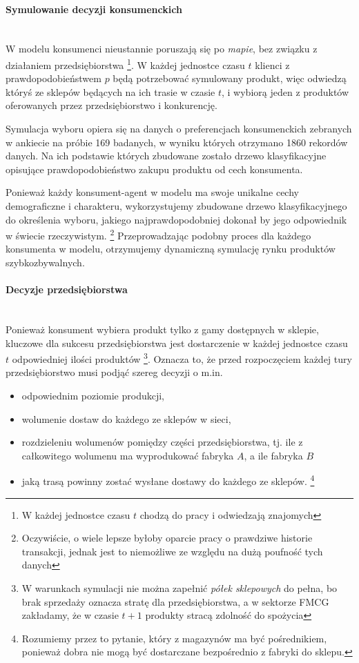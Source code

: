 \documentclass[polish, twoside, 12pt, a4paper]{article}
\theoremstyle{definition}
\theoremstyle{plain}
\theoremstyle{remark}
\begin{document}
\paragraph{Symulowanie decyzji konsumenckich}\mbox{}\\

W modelu konsumenci nieustannie poruszają się po \textit{mapie}, bez związku z działaniem przedsiębiorstwa \footnote{W każdej jednostce czasu $t$ chodzą do pracy i odwiedzają znajomych}. W każdej jednostce czasu $ t $ klienci z prawdopodobieństwem $ p $ będą potrzebować symulowany produkt, więc odwiedzą któryś ze sklepów będących na ich trasie w czasie $t$, i wybiorą jeden z produktów oferowanych przez przedsiębiorstwo i konkurencję. 

Symulacja wyboru opiera się na danych o preferencjach konsumenckich zebranych w ankiecie na próbie 169 badanych, w wyniku których otrzymano 1860 rekordów danych. Na ich podstawie których zbudowane zostało drzewo klasyfikacyjne opisujące prawdopodobieństwo zakupu produktu od cech konsumenta. 

Ponieważ każdy konsument-agent w modelu ma swoje unikalne cechy demograficzne i charakteru, wykorzystujemy zbudowane drzewo klasyfikacyjnego do określenia wyboru, jakiego najprawdopodobniej dokonał by jego odpowiednik w świecie rzeczywistym. \footnote{Oczywiście, o wiele lepsze byłoby oparcie pracy o prawdziwe historie transakcji, jednak jest to niemożliwe ze względu na dużą poufność tych danych} Przeprowadzając podobny proces dla każdego konsumenta w modelu, otrzymujemy dynamiczną symulację rynku produktów szybkozbywalnych. 

\paragraph{Decyzje przedsiębiorstwa}\mbox{}\\

Ponieważ konsument wybiera produkt tylko z gamy dostępnych w sklepie, kluczowe dla sukcesu przedsiębiorstwa jest dostarczenie w każdej jednostce czasu $t$ odpowiedniej ilości produktów \footnote{W warunkach symulacji nie można zapełnić \textit{półek sklepowych} do pełna, bo brak sprzedaży oznacza stratę dla przedsiębiorstwa, a w sektorze FMCG zakładamy, że w czasie $t+1$ produkty stracą zdolność do spożycia}. Oznacza to, że przed rozpoczęciem każdej tury przedsiębiorstwo musi podjąć szereg decyzji o m.in.
	\begin{itemize}
		\item odpowiednim poziomie produkcji,
		\item wolumenie dostaw do każdego ze sklepów w sieci,
		\item rozdzieleniu wolumenów pomiędzy części przedsiębiorstwa, tj. ile z całkowitego wolumenu ma wyprodukować fabryka $A$, a ile fabryka $B$
	 	\item jaką trasą powinny zostać wysłane dostawy do każdego ze sklepów. \footnote{Rozumiemy przez to pytanie, który z magazynów ma być pośrednikiem, ponieważ dobra nie mogą być dostarczane bezpośrednio z fabryki do sklepu.}
	\end{itemize}
\end{document}
